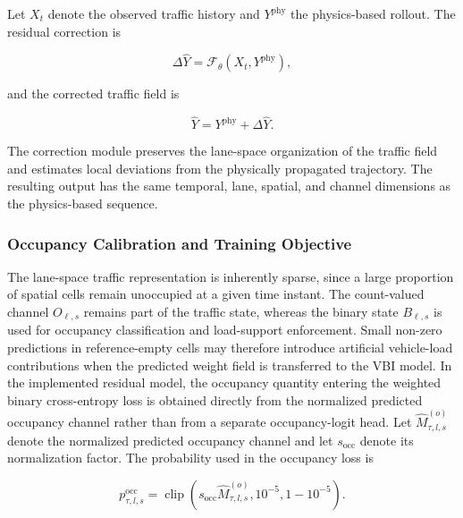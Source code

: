 \documentclass[journal]{IEEEtran}
\begin{document}
Let $X_t$ denote the observed traffic history and $Y^{\mathrm{phy}}$ the physics-based rollout. The residual correction is

\begin{equation}
\Delta\widehat{Y}
=
\mathcal{F}_{\theta}
\left(
X_t,
Y^{\mathrm{phy}}
\right),
\end{equation}

and the corrected traffic field is

\begin{equation}
\widehat{Y}
=
Y^{\mathrm{phy}}
+
\Delta\widehat{Y}.
\end{equation}

The correction module preserves the lane-space organization of the traffic field and estimates local deviations from the physically propagated trajectory. The resulting output has the same temporal, lane, spatial, and channel dimensions as the physics-based sequence.


\subsubsection{Occupancy Calibration and Training Objective}
\label{sec:occupancy_training}

{\color{blue}
The lane-space traffic representation is inherently sparse, since a large proportion of spatial cells remain unoccupied at a given time instant. The count-valued channel $O_{\ell,s}$ remains part of the traffic state, whereas the binary state $B_{\ell,s}$ is used for occupancy classification and load-support enforcement. Small non-zero predictions in reference-empty cells may therefore introduce artificial vehicle-load contributions when the predicted weight field is transferred to the VBI model. In the implemented residual model, the occupancy quantity entering the weighted binary cross-entropy loss is obtained directly from the normalized predicted occupancy channel rather than from a separate occupancy-logit head. Let $\widehat{M}_{\tau,l,s}^{(o)}$ denote the normalized predicted occupancy channel and let $s_{\mathrm{occ}}$ denote its normalization factor. The probability used in the occupancy loss is

\begin{equation}
p_{\tau,l,s}^{\mathrm{occ}}
=
\operatorname{clip}
\left(
s_{\mathrm{occ}}\widehat{M}_{\tau,l,s}^{(o)},
10^{-5},
1-10^{-5}
\right).
\end{equation}
}
\end{document}
